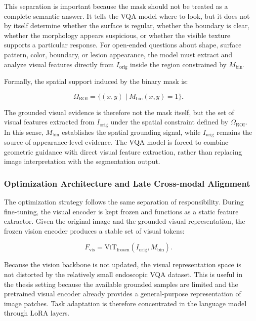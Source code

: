 This separation is important because the mask should not be treated as a complete semantic answer. It tells the VQA model where to look, but it does not by itself determine whether the surface is regular, whether the boundary is clear, whether the morphology appears suspicious, or whether the visible texture supports a particular response. For open-ended questions about shape, surface pattern, color, boundary, or lesion appearance, the model must extract and analyze visual features directly from $I_{\mathrm{orig}}$ inside the region constrained by $M_{\mathrm{bin}}$.

Formally, the spatial support induced by the binary mask is:

\begin{equation}
\Omega_{\mathrm{ROI}} = \{(x,y) \mid M_{\mathrm{bin}}(x,y)=1\}.
\end{equation}

The grounded visual evidence is therefore not the mask itself, but the set of visual features extracted from $I_{\mathrm{orig}}$ under the spatial constraint defined by $\Omega_{\mathrm{ROI}}$. In this sense, $M_{\mathrm{bin}}$ establishes the spatial grounding signal, while $I_{\mathrm{orig}}$ remains the source of appearance-level evidence. The VQA model is forced to combine geometric guidance with direct visual feature extraction, rather than replacing image interpretation with the segmentation output.

\subsubsection{Optimization Architecture and Late Cross-modal Alignment}
The optimization strategy follows the same separation of responsibility. During fine-tuning, the visual encoder is kept frozen and functions as a static feature extractor. Given the original image and the grounded visual representation, the frozen vision encoder produces a stable set of visual tokens:

\begin{equation}
F_{\mathrm{vis}} = \mathrm{ViT}_{\mathrm{frozen}}\left(I_{\mathrm{orig}}, M_{\mathrm{bin}}\right).
\end{equation}

Because the vision backbone is not updated, the visual representation space is not distorted by the relatively small endoscopic VQA dataset. This is useful in the thesis setting because the available grounded samples are limited and the pretrained visual encoder already provides a general-purpose representation of image patches. Task adaptation is therefore concentrated in the language model through LoRA layers.

